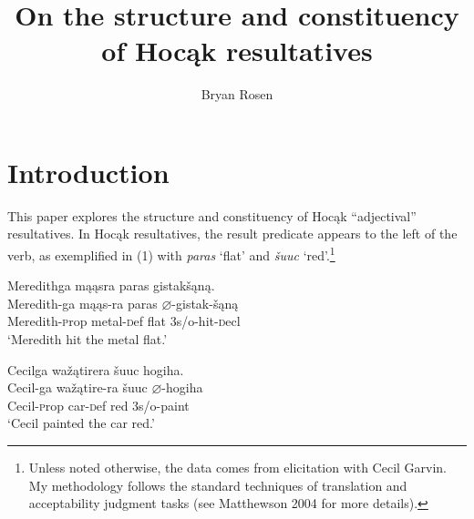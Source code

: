 \documentclass[output=paper]{LSP/langsci}
\author{Bryan Rosen}
\title{On the structure and constituency of Hoc\k{a}k resultatives}
\begin{document}
\section{Introduction}

This paper explores the structure and constituency of Hoc\k{a}k ``adjectival'' resultatives. In Hoc\k{a}k resultatives, the result predicate appears to the left of the verb, as exemplified in (1) with \textit{paras} `flat' and \textit{\v{s}uuc} `red'.\footnote{Unless noted otherwise, the data comes from  elicitation with Cecil Garvin. My methodology follows the standard techniques of translation and acceptability judgment tasks (see Matthewson 2004 for more details).}

\begin{exe}
\ex
\begin{xlist}

\ex \glll Meredithga m\k{a}\k{a}sra paras gistak\v{s}\k{a}n\k{a}. \\
 Meredith-ga m\k{a}\k{a}s-ra paras $\varnothing$-gistak-\v{s}\k{a}n\k{a}\\
Meredith-{\textsc prop} metal-{\textsc def} flat {\textsc 3s/o}-hit-{\textsc decl}\\
\glt `Meredith hit the metal flat.'

\ex \glll Cecilga wa\v{z}\k{a}tirera \v{s}uuc hogiha. \\
Cecil-ga  wa\v{z}\k{a}tire-ra \v{s}uuc $\varnothing$-hogiha \\
Cecil-{\textsc prop} car-{\textsc def} red {\textsc 3s/o}-paint\\
\glt `Cecil painted the car red.'

\end{xlist}
\end{exe}
\end{document}
